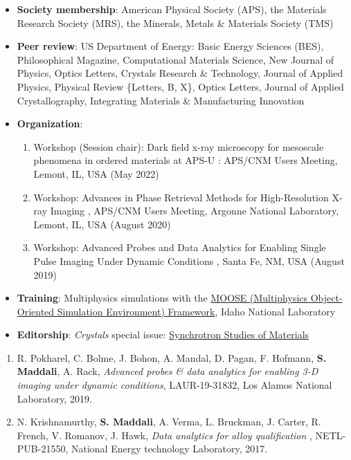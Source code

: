 \documentclass[10pt]{article}
\begin{document}
\begin{itemize}
    \item \textbf{Society membership}: American Physical Society (APS), the Materials Research Society (MRS), the Minerals, Metals \& Materials Society (TMS)
    \item \textbf{Peer review}: US Department of Energy: Basic Energy Sciences (BES), Philosophical Magazine, Computational Materials Science, New Journal of Physics, 
        Optics Letters, Crystals Research \& Technology, Journal of Applied Physics, Physical Review \{Letters, B, X\}, Optics Letters, Journal of Applied Crystallography, 
        Integrating Materials \& Manufacturing Innovation
    \item \textbf{Organization}: 
        \begin{enumerate}
            \item Workshop (Session chair): Dark field x-ray microscopy for mesoscale phenomena in ordered materials at APS-U : APS/CNM Users Meeting, Lemont, IL, USA (May 2022)
            \item Workshop: Advances in Phase Retrieval Methods for High-Resolution X-ray Imaging , APS/CNM Users Meeting, Argonne National Laboratory, Lemont, IL, USA (August 2020)
            \item Workshop: Advanced Probes and Data Analytics for Enabling Single Pulse Imaging Under Dynamic Conditions , Santa Fe, NM, USA (August 2019)
        \end{enumerate}
    \item \textbf{Training}: Multiphysics simulations with the \href{https://mooseframework.inl.gov/}{MOOSE (Multiphysics Object-Oriented Simulation Environment) Framework}, Idaho National Laboratory
    \item \textbf{Editorship}: \emph{Crystals} special issue: \href{https://web.archive.org/web/20210930195051/https://www.mdpi.com/journal/crystals/special_issues/Synchrotron_Studies}{Synchrotron Studies of Materials} 
\end{itemize} 

\begin{enumerate}
    \item R. Pokharel, C. Bolme, J. Bohon, A. Mandal, D. Pagan, F. Hofmann, \textbf{S. Maddali}, A. Rack, \emph{Advanced probes \& data analytics for enabling 3-D imaging under dynamic conditions}, LAUR-19-31832, Los Alamos National Laboratory, 2019. \href{https://web.archive.org/web/20210401223653/https://lanl.gov/science-innovation/science-facilities/dmmsc/_assets/docs/workshops/Advanced-Imaging-Report.pdf}{}
    \item N. Krishnamurthy, \textbf{S. Maddali}, A. Verma, L. Bruckman, J. Carter, R. French, V. Romanov, J. Hawk, \emph{Data analytics for alloy qualification} , NETL-PUB-21550, National Energy technology Laboratory, 2017. \href{https://doi.org/10.2172/1456238}{}
\end{enumerate} 
\end{document}
